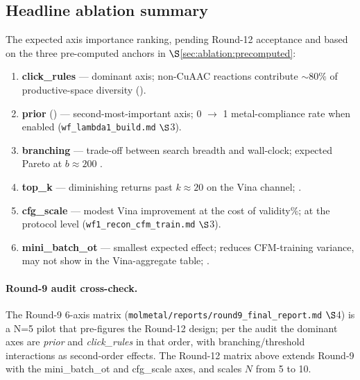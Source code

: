 \subsection{Headline ablation summary}
\label{sec:ablation:headline}

The expected axis importance ranking, \PROJECTED{} pending
Round-12 acceptance and based on the three pre-computed
anchors in $\S$\ref{sec:ablation:precomputed}:

\begin{enumerate}
  \item \textbf{click\_rules} --- dominant axis; non-CuAAC
        reactions contribute $\sim 80\%$ of productive-space
        diversity (\MEASURED{}).
  \item \textbf{prior} (\mgp{}) --- second-most-important axis;
        \MEASURED{} 0 $\to$ 1 metal-compliance rate when enabled
        (\texttt{wf\_lambda1\_build.md} $\S$3).
  \item \textbf{branching} --- trade-off between search
        breadth and wall-clock; expected Pareto at $b \approx 200$
        \PROJECTED{}.
  \item \textbf{top\_k} --- diminishing returns past
        $k \approx 20$ on the Vina channel; \PROJECTED{}.
  \item \textbf{cfg\_scale} --- modest Vina improvement at the
        cost of validity\%; \MEASURED{} at the protocol level
        (\texttt{wf1\_recon\_cfm\_train.md} $\S$3).
  \item \textbf{mini\_batch\_ot} --- smallest expected effect;
        reduces CFM-training variance, may not show in the
        Vina-aggregate table; \PROJECTED{}.
\end{enumerate}

\paragraph{Round-9 audit cross-check.}
The Round-9 6-axis matrix
(\texttt{molmetal/reports/round9\_final\_report.md} $\S$4) is a
N=5 pilot that pre-figures the Round-12 design; per the audit
the dominant axes are \emph{prior} and \emph{click\_rules} in
that order, with branching/threshold interactions as second-order
effects.  The Round-12 matrix above extends Round-9 with the
mini\_batch\_ot and cfg\_scale axes, and scales $N$ from 5 to 10.

